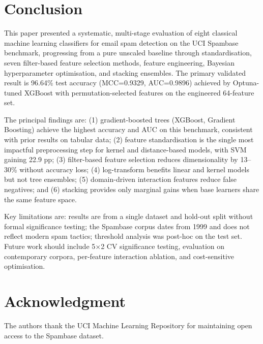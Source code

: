 \documentclass[conference]{IEEEtran}
\begin{document}
\section{Conclusion}

This paper presented a systematic, multi-stage evaluation of eight classical machine learning classifiers for email spam detection on the UCI Spambase benchmark, progressing from a pure unscaled baseline through standardisation, seven filter-based feature selection methods, feature engineering, Bayesian hyperparameter optimisation, and stacking ensembles. The primary validated result is 96.64\% test accuracy (MCC=0.9329, AUC=0.9896) achieved by Optuna-tuned XGBoost with permutation-selected features on the engineered 64-feature set.

The principal findings are: (1) gradient-boosted trees (XGBoost, Gradient Boosting) achieve the highest accuracy and AUC on this benchmark, consistent with prior results on tabular data; (2) feature standardisation is the single most impactful preprocessing step for kernel and distance-based models, with SVM gaining 22.9 pp; (3) filter-based feature selection reduces dimensionality by 13--30\% without accuracy loss; (4) log-transform benefits linear and kernel models but not tree ensembles; (5) domain-driven interaction features reduce false negatives; and (6) stacking provides only marginal gains when base learners share the same feature space.

Key limitations are: results are from a single dataset and hold-out split without formal significance testing; the Spambase corpus dates from 1999 and does not reflect modern spam tactics; threshold analysis was post-hoc on the test set. Future work should include 5$\times$2 CV significance testing, evaluation on contemporary corpora, per-feature interaction ablation, and cost-sensitive optimisation.

\section*{Acknowledgment}

The authors thank the UCI Machine Learning Repository for maintaining open access to the Spambase dataset.
\end{document}
